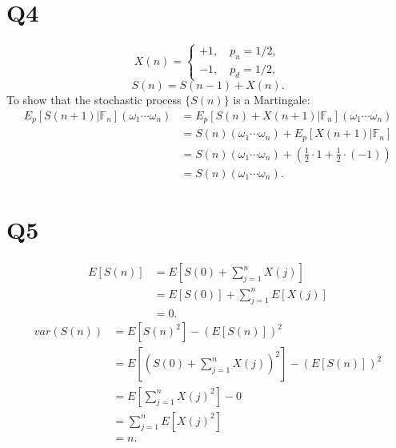\documentclass[final,3p,times]{elsarticle}
\begin{document}
\section{Q4}
	\begin{equation}
		X(n)=
		\begin{cases}
			+1, \quad p_u=1/2, \\
			-1, \quad p_d=1/2,
		\end{cases}
	\end{equation}
	\begin{equation}
		S(n)=S(n-1)+X(n).
	\end{equation}
	To show that the stochastic process $\{S(n)\}$ is a Martingale:
	\begin{equation}
		\begin{split}
			E_p[S(n+1)|\mathbb{F}_n](\omega_1\cdots\omega_n) &= E_p[S(n)+X(n+1)|\mathbb{F}_n](\omega_1\cdots\omega_n) \\
			&= S(n)(\omega_1\cdots\omega_n) + E_p[X(n+1)|\mathbb{F}_n] \\
			&= S(n)(\omega_1\cdots\omega_n) + \left(\frac{1}{2}\cdot 1+\frac{1}{2}\cdot (-1)\right) \\
			&= S(n)(\omega_1\cdots\omega_n)
			.
		\end{split}
	\end{equation}
	
\section{Q5}
	\begin{equation}
		\begin{split}
			E[S(n)]&=E[S(0)+\sum_{j=1}^{n} X(j)] \\
			&=E[S(0)]+\sum_{j=1}^{n} E[X(j)] \\
			&=0
			.
		\end{split}
	\end{equation}
	\begin{equation}
		\begin{split}
			var(S(n))&=E[S(n)^2]-\left(E[S(n)]\right)^2 \\
			&=E[\left(S(0)+\sum_{j=1}^{n}X(j)\right)^2]-\left(E[S(n)]\right)^2 \\
			&=E[\sum_{j=1}^{n} X(j)^2] - 0 \\
			&=\sum_{j=1}^{n} E[X(j)^2] \\
			&= n
			.
		\end{split}
	\end{equation}

	
\appendix
\end{document}
